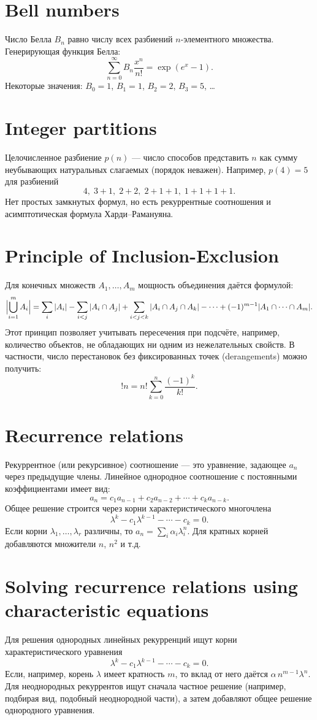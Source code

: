 \documentclass{article}
\begin{document}
\section{Bell numbers}
Число Белла $B_n$ равно числу всех разбиений $n$-элементного множества. Генерирующая функция Белла:
\[
\sum_{n=0}^\infty B_n \frac{x^n}{n!} = \exp(e^x - 1).
\]
Некоторые значения: $B_0=1$, $B_1=1$, $B_2=2$, $B_3=5$, \dots

\section{Integer partitions}
Целочисленное разбиение $p(n)$ --- число способов представить $n$ как сумму неубывающих натуральных слагаемых (порядок неважен). Например, $p(4)=5$ для разбиений 
\[
4,\;3+1,\;2+2,\;2+1+1,\;1+1+1+1.
\]
Нет простых замкнутых формул, но есть рекуррентные соотношения и асимптотическая формула Харди--Рамануяна.

\section{Principle of Inclusion-Exclusion}
Для конечных множеств $A_1,\dots,A_m$ мощность объединения даётся формулой:
\[
\Bigl|\bigcup_{i=1}^m A_i\Bigr| = \sum_{i}|A_i| - \sum_{i<j}|A_i\cap A_j| + \sum_{i<j<k}|A_i\cap A_j\cap A_k| - \cdots + (-1)^{m-1}|A_1\cap \cdots \cap A_m|.
\]
Этот принцип позволяет учитывать пересечения при подсчёте, например, количество объектов, не обладающих ни одним из нежелательных свойств. В частности, число перестановок без фиксированных точек (derangements) можно получить:
\[
!n = n!\sum_{k=0}^n \frac{(-1)^k}{k!}.
\]

\section{Recurrence relations}
Рекуррентное (или рекурсивное) соотношение --- это уравнение, задающее $a_n$ через предыдущие члены. Линейное однородное соотношение с постоянными коэффициентами имеет вид:
\[
a_n = c_1 a_{n-1} + c_2 a_{n-2} + \cdots + c_k a_{n-k}.
\]
Общее решение строится через корни характеристического многочлена
\[
\lambda^k - c_1 \lambda^{k-1} - \cdots - c_k = 0.
\]
Если корни $\lambda_1,\dots,\lambda_r$ различны, то $a_n = \sum_i \alpha_i \lambda_i^n$. Для кратных корней добавляются множители $n$, $n^2$ и т.д.

\section{Solving recurrence relations using characteristic equations}
Для решения однородных линейных рекурренций ищут корни характеристического уравнения 
\[
\lambda^k - c_1 \lambda^{k-1} - \cdots - c_k = 0.
\]
Если, например, корень $\lambda$ имеет кратность $m$, то вклад от него даётся $\alpha\,n^{m-1}\lambda^n$. Для неоднородных рекуррентов ищут сначала частное решение (например, подбирая вид, подобный неоднородной части), а затем добавляют общее решение однородного уравнения.
\end{document}
